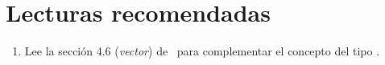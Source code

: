 \section{Lecturas recomendadas}

\begin{enumerate}

\item Lee la sección 4.6 (\emph{vector}) de~\cite{stroustrup:2014} para complementar
      el concepto del tipo .

\end{enumerate}
